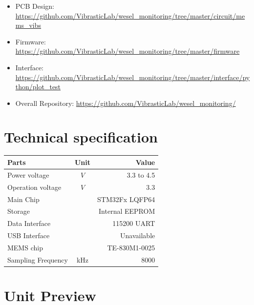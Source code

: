 \documentclass[a4paper,12pt,oneside,pdflatex,italian,final,twocolumn]{article}
\begin{document}
	\begin{itemize}
		\item PCB Design: \url{https://github.com/VibrasticLab/wesel_monitoring/tree/master/circuit/mems_vibs}
		
		\item Firmware: \url{https://github.com/VibrasticLab/wesel_monitoring/tree/master/firmware}
		
		\item Interface: \url{https://github.com/VibrasticLab/wesel_monitoring/tree/master/interface/python/plot_test}
		
		\item Overall Repository: \url{https://github.com/VibrasticLab/wesel_monitoring/}
	\end{itemize}

	\section{Technical specification}
	\centering
	\begin{tabular}{lcr}
		\toprule
		Parts & Unit & Value \\
		\midrule
		Power voltage & $V$ & 3.3 to 4.5 \\
		Operation voltage & $V$ & 3.3 \\
		Main Chip & & STM32Fx LQFP64 \\
		Storage & & Internal EEPROM \\
		Data Interface & & 115200 UART \\
		USB Interface & & Unavailable \\
		MEMS chip & & TE-830M1-0025 \\
		Sampling Frequency & kHz & 8000 \\
		\bottomrule
	\end{tabular}

	\raggedright
	
	\newpage
	\section{Unit Preview}
	
\end{document}
